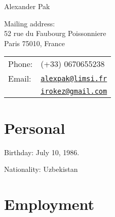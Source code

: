 \documentclass[letterpaper]{article}
\def\name{Alexander Pak}
\renewenvironment{itemize}{
  \begin{list}{}{
    \setlength{\leftmargin}{0.6em}
  }
}{
  \end{list}
}
\begin{document}
{\huge \name}


\vspace{0.25in}

\begin{minipage}{0.45\linewidth}
	Mailing address:\\
	52 rue du Faubourg Poissonniere \\
	Paris 75010, France
\end{minipage}
\begin{minipage}{0.45\linewidth}
  \begin{tabular}{ll}
    Phone: & (+33) 0670655238 \\
    Email: & \href{mailto:alexpak@limsi.fr}{\tt alexpak@limsi.fr}\\
	       & \href{mailto:irokez@gmail.com}{\tt irokez@gmail.com}
  \end{tabular}
\end{minipage}

\section*{Personal}

\begin{itemize}
\item Birthday: July 10, 1986.
\item Nationality: Uzbekistan
\end{itemize}


\section*{Employment}
\end{document}
